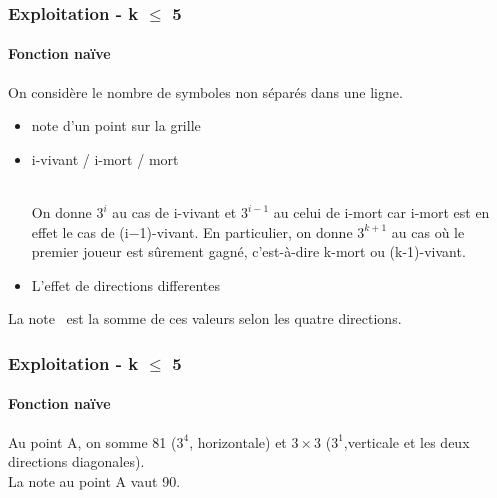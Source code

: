 \documentclass{beamer}
\begin{document}
\begin{frame}
    \frametitle{Exploitation - k $\le$ 5}
    \framesubtitle{Fonction naïve}
    On considère le nombre de symboles non séparés dans une ligne.
    \begin{itemize}
        \item note d'un point sur la grille
        \item i-vivant / i-mort / mort
    \centering
    \\
    \ \\

\cleargoban
On donne $3^{i}$ au cas de i-vivant et $3^{i-1}$ au celui de i-mort car i-mort est en effet le cas de (i$-$1)-vivant. En particulier, on donne $3^{k+1}$ au cas où le premier joueur est sûrement gagné, c'est-à-dire k-mort ou (k-1)-vivant. 
        \item L'effet de directions differentes
    \centering
        \shortstack{\showgoban}
\cleargoban

    \end{itemize}
    La \og note \fg \ est la somme de ces valeurs selon les quatre directions. 
    \centering
        \shortstack{\showgoban}
\end{frame}

\begin{frame}
    \frametitle{Exploitation - k $\le$ 5}
    \framesubtitle{Fonction naïve}
    \cleargoban

    \begin{center}
        \shortstack{\showgoban}
    \end{center}
Au point A, on somme 81 ($3^{4}$, horizontale) et $3\times 3$ ($3^1$,verticale et les deux directions diagonales).\\
La note au point A vaut 90.
\end{frame}
\end{document}
